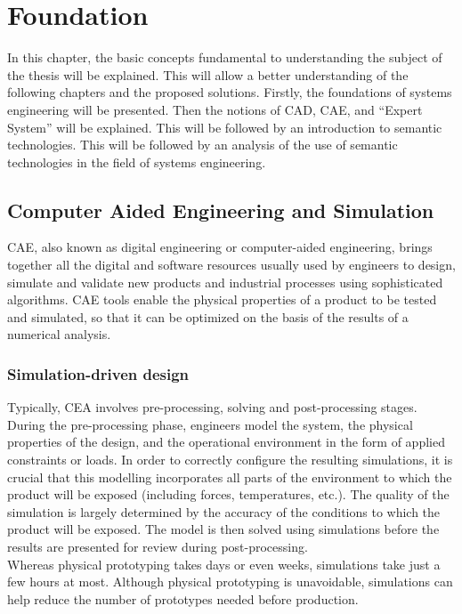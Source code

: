 \section{Foundation\label{sec:foundation}}
In this chapter, the basic concepts fundamental to understanding the subject of the thesis will be explained. This will allow a better understanding of the following chapters and the proposed solutions. Firstly, the foundations of systems engineering will be presented. Then the notions of CAD, CAE, and “Expert System” will be explained. This will be followed by an introduction to semantic technologies. This will be followed by an analysis of the use of semantic technologies in the field of systems engineering. 



\subsection{Computer Aided Engineering and Simulation}
CAE, also known as digital engineering or computer-aided engineering, brings together all the digital and software resources usually used by engineers to design, simulate and validate new products and industrial processes using sophisticated algorithms. CAE tools enable the physical properties of a product to be tested and simulated, so that it can be optimized on the basis of the results of a numerical analysis.

    \subsubsection{Simulation-driven design}
    Typically, CEA involves pre-processing, solving and post-processing stages. During the pre-processing phase, engineers model the system, the physical properties of the design, and the operational environment in the form of applied constraints or loads. In order to correctly configure the resulting simulations, it is crucial that this modelling incorporates all parts of the environment to which the product will be exposed (including forces, temperatures, etc.).  The quality of the simulation is largely determined by the accuracy of the conditions to which the product will be exposed. The model is then solved using simulations before the results are presented for review during post-processing. \\

    Whereas physical prototyping takes days or even weeks, simulations take just a few hours at most. Although physical prototyping is unavoidable, simulations can help reduce the number of prototypes needed before production.\\
    

